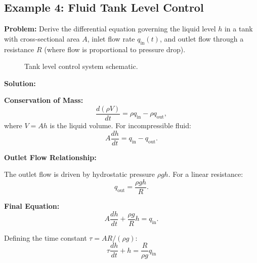 \subsection{Example 4: Fluid Tank Level Control}

\textbf{Problem:} Derive the differential equation governing the liquid level $h$ in a tank with cross-sectional area $A$, inlet flow rate $q_{\text{in}}(t)$, and outlet flow through a resistance $R$ (where flow is proportional to pressure drop).

\begin{figure}[htbp]
\centering
{}
\caption{Tank level control system schematic.}
\label{fig:tank}
\end{figure}

\textbf{Solution:}

\textbf{Conservation of Mass:}
\begin{equation}
\frac{d(\rho V)}{dt} = \rho q_{\text{in}} - \rho q_{\text{out}},
\end{equation}
where $V = Ah$ is the liquid volume. For incompressible fluid:
\begin{equation}
A\frac{dh}{dt} = q_{\text{in}} - q_{\text{out}}.
\end{equation}

\textbf{Outlet Flow Relationship:}

The outlet flow is driven by hydrostatic pressure $\rho g h$. For a linear resistance:
\begin{equation}
q_{\text{out}} = \frac{\rho g h}{R}.
\end{equation}

\textbf{Final Equation:}
\begin{equation}
A\frac{dh}{dt} + \frac{\rho g}{R}h = q_{\text{in}}.
\end{equation}

Defining the time constant $\tau = AR/(\rho g)$:
\begin{equation}
\boxed{\tau\frac{dh}{dt} + h = \frac{R}{\rho g}q_{\text{in}}}
\end{equation}

